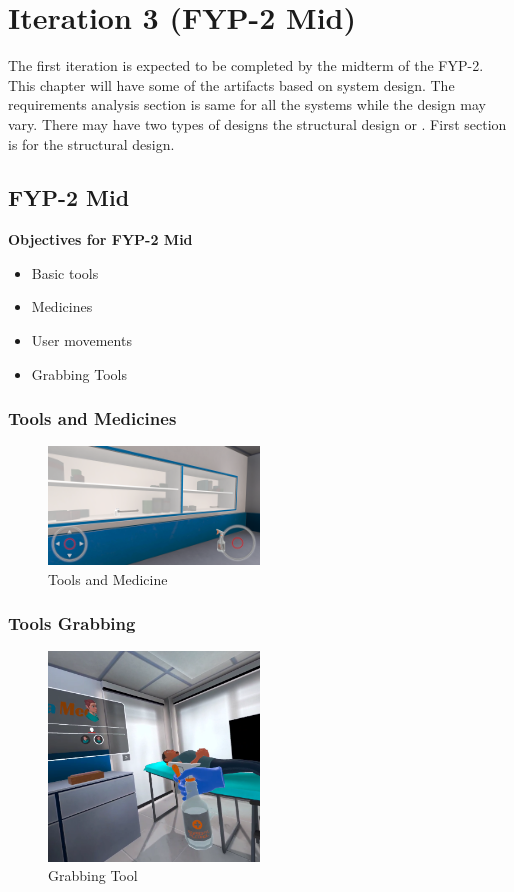 \chapter{Iteration 3 (FYP-2 Mid)}
\label{ch:iter3}

The first iteration is expected to be completed by the midterm of the FYP-2.
This chapter will have some of the artifacts based on system design. The requirements analysis section is same for all the systems while the design may vary. There may have two types of designs the structural design or . First section is for the structural design.


\section{FYP-2 Mid}
\textbf{Objectives for FYP-2 Mid}
	\begin{itemize}
		\item Basic tools
		\item Medicines 
		\item User movements
		\item Grabbing Tools
	\end{itemize}
\newpage
\subsection{Tools and Medicines}
\begin{figure}[h]
	\centering
	\includegraphics[width=0.5\textwidth, height=0.3\textheight]{Images/Tools and Medicine.png}
	\caption{Tools and Medicine}
	\label{fig:Tools and Medicine}
\end{figure}

\subsection{Tools Grabbing}
\begin{figure}[h]
	\centering
	\includegraphics[width=0.5\textwidth, height=0.3\textheight]{Images/Grabbing Tool.png}
	\caption{Grabbing Tool}
	\label{fig:Grabbing-Tool}
\end{figure}

